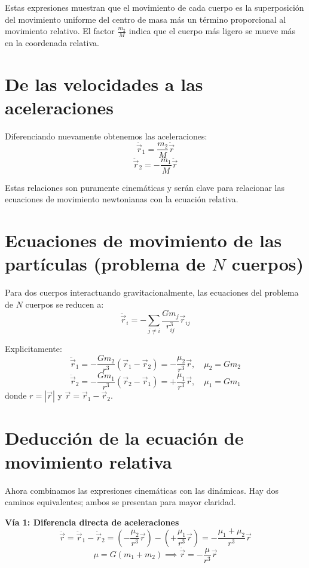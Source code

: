 \begin{importante}
Estas expresiones muestran que el movimiento de cada cuerpo es la superposición del movimiento uniforme del centro de masa más un término proporcional al movimiento relativo. El factor \(\frac{m_2}{M}\) indica que el cuerpo más ligero se mueve más en la coordenada relativa.
\end{importante}

\section{De las velocidades a las aceleraciones}
Diferenciando nuevamente obtenemos las aceleraciones:
\[
\ddot{\vec{r}}_1 = \frac{m_2}{M} \ddot{\vec{r}}
\]
\[
\ddot{\vec{r}}_2 = -\frac{m_1}{M} \ddot{\vec{r}}
\]

Estas relaciones son puramente cinemáticas y serán clave para relacionar las ecuaciones de movimiento newtonianas con la ecuación relativa.

\section{Ecuaciones de movimiento de las partículas (problema de \texorpdfstring{$N$}{N} cuerpos)}
Para dos cuerpos interactuando gravitacionalmente, las ecuaciones del problema de \(N\) cuerpos se reducen a:
\[
\ddot{\vec{r}}_i = -\sum_{j \neq i} \frac{G m_j}{r_{ij}^3} \vec{r}_{ij}
\]

Explicitamente:
\[
\ddot{\vec{r}}_1 = -\frac{G m_2}{r^3} (\vec{r}_1 - \vec{r}_2) = -\frac{\mu_2}{r^3} \vec{r}, \quad \mu_2 = G m_2
\]
\[
\ddot{\vec{r}}_2 = -\frac{G m_1}{r^3} (\vec{r}_2 - \vec{r}_1) = +\frac{\mu_1}{r^3} \vec{r}, \quad \mu_1 = G m_1
\]
donde \(r = |\vec{r}|\) y \(\vec{r} = \vec{r}_1 - \vec{r}_2\).

\section{Deducción de la ecuación de movimiento relativa}
Ahora combinamos las expresiones cinemáticas con las dinámicas. Hay dos caminos equivalentes; ambos se presentan para mayor claridad.

\textbf{Vía 1: Diferencia directa de aceleraciones}
\[
\ddot{\vec{r}} = \ddot{\vec{r}}_1 - \ddot{\vec{r}}_2 = \left( -\frac{\mu_2}{r^3} \vec{r} \right) - \left( +\frac{\mu_1}{r^3} \vec{r} \right) = -\frac{\mu_1 + \mu_2}{r^3} \vec{r}
\]
\[
\mu = G(m_1 + m_2) \implies \ddot{\vec{r}} = -\frac{\mu}{r^3} \vec{r}
\]

